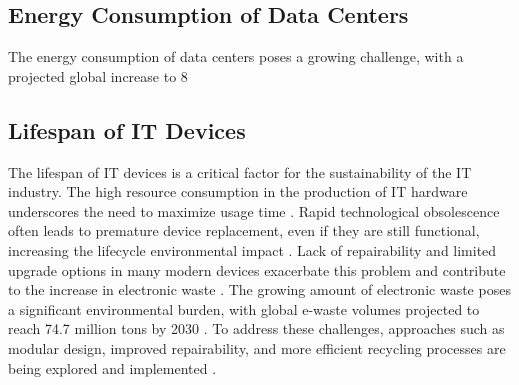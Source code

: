\documentclass[10pt,twocolumn,conference]{IEEEtran}
\begin{document}
\subsection{Energy Consumption of Data Centers}
The energy consumption of data centers poses a growing challenge, with a projected global increase to 8%

\subsection{Lifespan of IT Devices}
The lifespan of IT devices is a critical factor for the sustainability of the IT industry. The high resource consumption in the production of IT hardware underscores the need to maximize usage time \cite{tomlinson2010}. Rapid technological obsolescence often leads to premature device replacement, even if they are still functional, increasing the lifecycle environmental impact \cite{belkhir2018}. Lack of repairability and limited upgrade options in many modern devices exacerbate this problem and contribute to the increase in electronic waste \cite{baldé2017}. The growing amount of electronic waste poses a significant environmental burden, with global e-waste volumes projected to reach 74.7 million tons by 2030 \cite{baldé2017}. To address these challenges, approaches such as modular design, improved repairability, and more efficient recycling processes are being explored and implemented \cite{pohl2019}.
\end{document}
